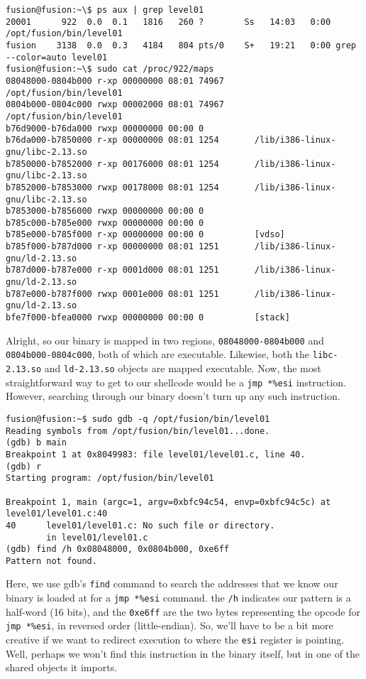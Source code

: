 \begin{lstlisting}
fusion@fusion:~\$ ps aux | grep level01
20001      922  0.0  0.1   1816   260 ?        Ss   14:03   0:00 /opt/fusion/bin/level01
fusion    3138  0.0  0.3   4184   804 pts/0    S+   19:21   0:00 grep --color=auto level01
fusion@fusion:~\$ sudo cat /proc/922/maps
08048000-0804b000 r-xp 00000000 08:01 74967      /opt/fusion/bin/level01
0804b000-0804c000 rwxp 00002000 08:01 74967      /opt/fusion/bin/level01
b76d9000-b76da000 rwxp 00000000 00:00 0 
b76da000-b7850000 r-xp 00000000 08:01 1254       /lib/i386-linux-gnu/libc-2.13.so
b7850000-b7852000 r-xp 00176000 08:01 1254       /lib/i386-linux-gnu/libc-2.13.so
b7852000-b7853000 rwxp 00178000 08:01 1254       /lib/i386-linux-gnu/libc-2.13.so
b7853000-b7856000 rwxp 00000000 00:00 0 
b785c000-b785e000 rwxp 00000000 00:00 0 
b785e000-b785f000 r-xp 00000000 00:00 0          [vdso]
b785f000-b787d000 r-xp 00000000 08:01 1251       /lib/i386-linux-gnu/ld-2.13.so
b787d000-b787e000 r-xp 0001d000 08:01 1251       /lib/i386-linux-gnu/ld-2.13.so
b787e000-b787f000 rwxp 0001e000 08:01 1251       /lib/i386-linux-gnu/ld-2.13.so
bfe7f000-bfea0000 rwxp 00000000 00:00 0          [stack]
\end{lstlisting}
Alright, so our binary is mapped in two regions, \texttt{08048000-0804b000}
and \texttt{0804b000-0804c000}, both of which are executable. Likewise,
both the \texttt{libc-2.13.so} and \texttt{ld-2.13.so} objects are
mapped executable. Now,
the most straightforward way to get to our shellcode would be a 
\texttt{jmp *\%esi} instruction. However, searching through
our binary doesn't turn up any such instruction.

\begin{lstlisting}
fusion@fusion:~$ sudo gdb -q /opt/fusion/bin/level01
Reading symbols from /opt/fusion/bin/level01...done.
(gdb) b main
Breakpoint 1 at 0x8049983: file level01/level01.c, line 40.
(gdb) r
Starting program: /opt/fusion/bin/level01 

Breakpoint 1, main (argc=1, argv=0xbfc94c54, envp=0xbfc94c5c) at level01/level01.c:40
40      level01/level01.c: No such file or directory.
        in level01/level01.c
(gdb) find /h 0x08048000, 0x0804b000, 0xe6ff
Pattern not found.
\end{lstlisting}

Here, we use gdb's \texttt{find} command to search the addresses
that we know our binary is loaded at for a \texttt{jmp *\%esi} command.
the \texttt{/h} indicates our pattern is a half-word (16 bits),
and the \texttt{0xe6ff} are the two bytes representing the opcode for
\texttt{jmp *\%esi}, in reversed order (little-endian).
So, we'll have to be a bit more creative if we want to redirect
execution to where the \texttt{esi} register is pointing.
Well, perhaps we won't find this instruction in the binary itself,
but in one of the shared objects it imports.

